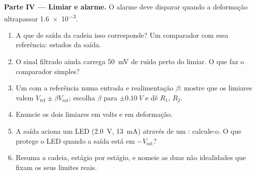 \begin{problem}
\medskip
\noindent\textbf{Parte IV --- Limiar e alarme.}
O alarme deve disparar quando a deformação ultrapassar \num{1.6e-3}.
\begin{enumerate}[resume]
  \item A que  de saída da cadeia isso corresponde? Um
        comparador com essa referência: estados da saída.
  \item O sinal filtrado ainda carrega \qty{50}{mV} de ruído perto do
        limiar. O que faz o comparador simples?
  \item Um  com a referência numa entrada e realimentação
        $\beta$: mostre que os limiares valem $V_{\mathrm{ref}} \pm
        \beta V_{\mathrm{sat}}$; escolha $\beta$ para $\pm\qty{0.10}{V}$
        e dê $R_1$, $R_2$.
  \item Enuncie os dois limiares em volts e em deformação.
  \item A saída aciona um LED (\qty{2.0}{V}, \qty{13}{mA}) através de um
        : calcule-o. O que protege o LED quando a saída está
        em $-V_{\mathrm{sat}}$?
  \item Resuma a cadeia, estágio por estágio, e nomeie as duas
        não idealidades que fixam os seus limites reais.
\end{enumerate}
\end{problem}
